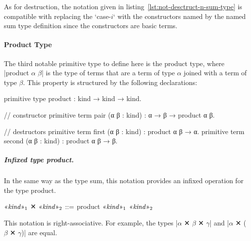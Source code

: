 As for destruction, the notation given in listing~\ref{lst:not-desctruct-n-sum-type} is compatible with replacing the \code`case-$i$` with the constructors named by the named sum type definition since the constructors are basic terms.

\paragraph{Product Type}

The third notable primitive type to define here is the product type, where \code|product $α$ $β$| is the type of terms that are a term of type $α$ joined with a term of type $β$.
This property is structured by the following declarations:
\begin{program}[caption={Primitives for \code|product|.}]
primitive type product : kind → kind → kind.

// constructor
primitive term pair (α β : kind) : α → β → product α β.

// destructors
primitive term first (α β : kind) : product α β → α.
primitive term second (α β : kind) : product α β → β.
\end{program}

\subparagraph{Infixed type product.}
In the same way as the type sum, this notation provides an infixed operation for the type product.
\begin{notational}[caption={Notation for infixed type product}]
$\mvar{kind}_1$ ✕ $\mvar{kind}_2$   $\syneq$   product $\mvar{kind}_1$ $\mvar{kind}_2$
\end{notational}
This notation is right-associative.
For example, the types \code|$α$ ✕ $β$ ✕ $γ$| and \code|$α$ ✕ ($β$ ✕ $γ$)| are equal.

